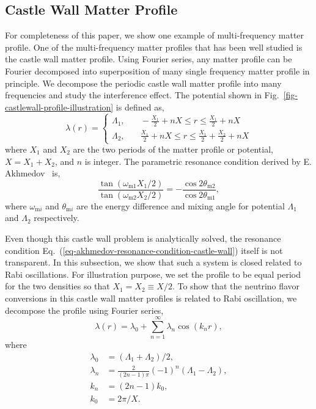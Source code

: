 \documentclass[%
reprint,
 amsmath,amssymb,
 prd,
]{revtex4-1}
\begin{document}
\subsection{Castle Wall Matter Profile}



For completeness of this paper, we show one example of multi-frequency matter profile. One of the multi-frequency matter profiles that has been well studied is the castle wall matter profile. Using Fourier series, any matter profile can be Fourier decomposed into superposition of many single frequency matter profile in principle. We decompose the periodic castle wall matter profile into many frequencies and study the interference effect. The potential shown in Fig.~\ref{fig-castlewall-profile-illustration} is defined as,
\begin{equation}
    \lambda(r) = \begin{cases}
\Lambda_1, &\quad -\frac{X_1}{2}+nX\le r\le \frac{X_1}{2}+nX \\
\Lambda_2, &\quad \frac{X_1}{2}+nX\le r\le \frac{X_1}{2}+\frac{X_2}{2} +nX
\end{cases}
\label{eq-castle-wall-potential}
\end{equation}
where $X_1$ and $X_2$ are the two periods of the matter profile or potential, $X=X_1+X_2$, and $n$ is integer. The parametric resonance condition derived by E. Akhmedov~\cite{Akhmedov2000} is,
\begin{equation}
    \frac{\tan (\omega_{\mathrm m1}X_1/2)}{\tan (\omega_{\mathrm m2}X_2/2)} = - \frac{\cos 2\theta_{\mathrm m2}}{\cos 2\theta_{\mathrm m1}},
    \label{eq-akhmedov-resonance-condition-castle-wall}
\end{equation}
where $\omega_{\mathrm{m}i}$ and $\theta_{\mathrm{m}i}$ are the energy difference and mixing angle for potential $\Lambda_1$ and $\Lambda_2$ respectively.



Even though this castle wall problem is analytically solved, the resonance condition Eq.~(\ref{eq-akhmedov-resonance-condition-castle-wall}) itself is not transparent. In this subsection, we show that such a system is closed related to Rabi oscillations. For illustration purpose, we set the profile to be equal period for the two densities so that $X_1=X_2\equiv X/2$. To show that the neutrino flavor conversions in this castle wall matter profiles is related to Rabi oscillation, we decompose the profile using Fourier series,
\begin{equation}
\lambda(r) = \lambda_0 + \sum_{n=1}^{\infty} \lambda_n \cos\left( k_n  r \right),
\label{eq-castle-wall-fourier-expanded}
\end{equation}
where
\begin{align*}
\lambda_0 &= (\Lambda_1 + \Lambda_2)/2, \\
\lambda_n & = \frac{2}{(2n-1)\pi}  (-1)^n  \left( \Lambda_1 -  \Lambda_2 \right),\\
k_n &= (2n-1)k_0, \\
k_0 &= 2\pi/X.
\end{align*}
\end{document}
